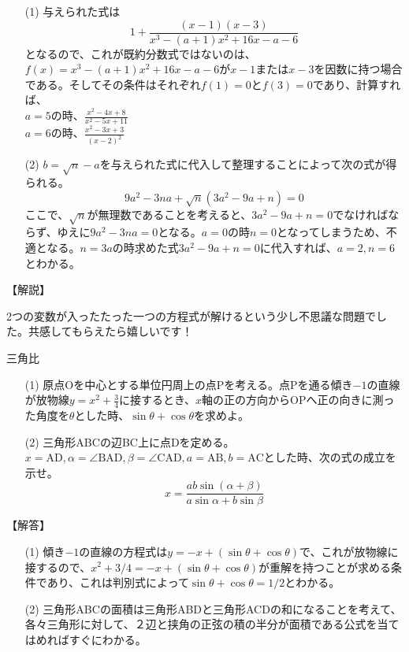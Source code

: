 \documentclass[a4paper,fleqn,dvipdfmx]{jsarticle}
\begin{document}
\begin{itemize}
    \item [(1)] 与えられた式は
    $$1+\frac{(x-1)(x-3)}{x^3-(a+1)x^2+16x-a-6}$$
    となるので、これが既約分数式ではないのは、$f(x)=x^3-(a+1)x^2+16x-a-6$が$x-1$または$x-3$を因数に持つ場合である。そしてその条件はそれぞれ$f(1)=0$と$f(3)=0$であり、計算すれば、\\
    $a=5$の時、$\displaystyle\frac{x^2-4x+8}{x^2-5x+11}$\\
    $a=6$の時、$\displaystyle\frac{x^2-3x+3}{(x-2)^2}$
    \item [(2)] $b=\sqrt{n}-a$を与えられた式に代入して整理することによって次の式が得られる。$$9a^2-3na+\sqrt{n}(3a^2-9a+n)=0$$ここで、$\sqrt{n}$が無理数であることを考えると、$3a^2-9a+n=0$でなければならず、ゆえに$9a^2-3na=0$となる。$a=0$の時$n=0$となってしまうため、不適となる。$n=3a$の時求めた式$3a^2-9a+n=0$に代入すれば、$a=2,n=6$とわかる。
    
\end{itemize}

\begin{flushleft}
    【解説】
\end{flushleft}

2つの変数が入ったたった一つの方程式が解けるという少し不思議な問題でした。共感してもらえたら嬉しいです！



\newpage

\begin{itembox}[l]{三角比}
    \begin{itemize}
        \item [(1)] 原点Oを中心とする単位円周上の点Pを考える。点Pを通る傾き$-1$の直線が放物線$y=x^2+\frac{3}{4}$に接するとき、$x$軸の正の方向からOPへ正の向きに測った角度を$\theta$とした時、$\sin\theta+\cos\theta$を求めよ。
        \item [(2)] 三角形ABCの辺BC上に点Dを定める。$x=\mathrm{AD},\alpha=\angle\mathrm{BAD},\beta=\angle\mathrm{CAD},a=\mathrm{AB},b=\mathrm{AC}$とした時、次の式の成立を示せ。
        $$x=\frac{ab\sin{(\alpha+\beta)}}{a\sin{\alpha}+b\sin{\beta}}$$
    \end{itemize}

\end{itembox}


\begin{flushleft}
【解答】
\end{flushleft}

\begin{itemize}
    \item [(1)] 傾き$-1$の直線の方程式は$y=-x+(\sin \theta + \cos \theta)$で、これが放物線に接するので、$x^2+3/4=-x+(\sin \theta + \cos \theta)$が重解を持つことが求める条件であり、これは判別式によって$\sin \theta + \cos \theta=1/2$とわかる。
    \item [(2)] 三角形ABCの面積は三角形ABDと三角形ACDの和になることを考えて、各々三角形に対して、２辺と挟角の正弦の積の半分が面積である公式を当てはめればすぐにわかる。
    
\end{itemize}
\end{document}
